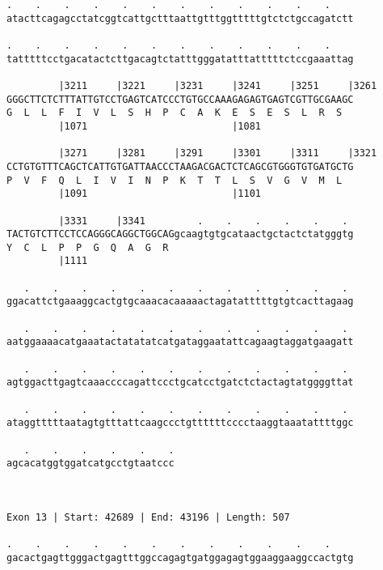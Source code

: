 \documentclass{article}
\begin{document}
\begin{Verbatim}
.    .    .    .    .    .    .    .    .    .    .    .    
atacttcagagcctatcggtcattgctttaattgtttggtttttgtctctgccagatctt
                                                            
.    .    .    .    .    .    .    .    .    .    .    .    
tatttttcctgacatactcttgacagtctatttgggatatttatttttctccgaaattag
                                                            
         |3211     |3221     |3231     |3241     |3251     |3261
GGGCTTCTCTTTATTGTCCTGAGTCATCCCTGTGCCAAAGAGAGTGAGTCGTTGCGAAGC
G  L  L  F  I  V  L  S  H  P  C  A  K  E  S  E  S  L  R  S  
         |1071                         |1081                
  
         |3271     |3281     |3291     |3301     |3311     |3321
CCTGTGTTTCAGCTCATTGTGATTAACCCTAAGACGACTCTCAGCGTGGGTGTGATGCTG
P  V  F  Q  L  I  V  I  N  P  K  T  T  L  S  V  G  V  M  L  
         |1091                         |1101                
  
         |3331     |3341         .    .    .    .    .    . 
TACTGTCTTCCTCCAGGGCAGGCTGGCAGgcaagtgtgcataactgctactctatgggtg
Y  C  L  P  P  G  Q  A  G  R                                
         |1111                                              
  
   .    .    .    .    .    .    .    .    .    .    .    . 
ggacattctgaaaggcactgtgcaaacacaaaaactagatatttttgtgtcacttagaag
                                                            
   .    .    .    .    .    .    .    .    .    .    .    . 
aatggaaaacatgaaatactatatatcatgataggaatattcagaagtaggatgaagatt
                                                            
   .    .    .    .    .    .    .    .    .    .    .    . 
agtggacttgagtcaaaccccagattccctgcatcctgatctctactagtatggggttat
                                                            
   .    .    .    .    .    .    .    .    .    .    .    . 
ataggtttttaatagtgtttattcaagccctgttttttcccctaaggtaaatattttggc
                                                            
   .    .    .    .    .    .
agcacatggtggatcatgcctgtaatccc
                             
                             
 
Exon 13 | Start: 42689 | End: 43196 | Length: 507
 
.    .    .    .    .    .    .    .    .    .    .    .    
gacactgagttgggactgagtttggccagagtgatggagagtggaaggaaggccactgtg
                                                            

\end{Verbatim}
\end{document}
